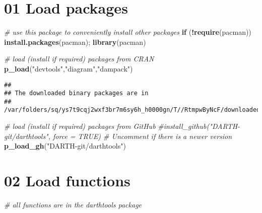 \documentclass[
]{article}
\newenvironment{Shaded}{\begin{snugshade}}{\end{snugshade}}
\newcommand{\CommentTok}[1]{\textcolor[rgb]{0.56,0.35,0.01}{\textit{#1}}}
\newcommand{\ControlFlowTok}[1]{\textcolor[rgb]{0.13,0.29,0.53}{\textbf{#1}}}
\newcommand{\FunctionTok}[1]{\textcolor[rgb]{0.13,0.29,0.53}{\textbf{#1}}}
\newcommand{\NormalTok}[1]{#1}
\newcommand{\SpecialCharTok}[1]{\textcolor[rgb]{0.81,0.36,0.00}{\textbf{#1}}}
\newcommand{\StringTok}[1]{\textcolor[rgb]{0.31,0.60,0.02}{#1}}
\begin{document}
\hypertarget{load-packages}{%
\section{01 Load packages}\label{load-packages}}

\begin{Shaded}
\begin{Highlighting}[]
\CommentTok{\# use this package to conveniently install other packages}
\ControlFlowTok{if}\NormalTok{ (}\SpecialCharTok{!}\FunctionTok{require}\NormalTok{(}\StringTok{\textquotesingle{}pacman\textquotesingle{}}\NormalTok{)) }\FunctionTok{install.packages}\NormalTok{(}\StringTok{\textquotesingle{}pacman\textquotesingle{}}\NormalTok{); }\FunctionTok{library}\NormalTok{(pacman) }

\CommentTok{\# load (install if required) packages from CRAN}
\FunctionTok{p\_load}\NormalTok{(}\StringTok{"devtools"}\NormalTok{,}\StringTok{"diagram"}\NormalTok{,}\StringTok{"dampack"}\NormalTok{)}
\end{Highlighting}
\end{Shaded}

\begin{verbatim}
## 
## The downloaded binary packages are in
##  /var/folders/sq/ys7t9cqj2wxf3br7m6sy6h_h0000gn/T//RtmpwByNcF/downloaded_packages
\end{verbatim}

\begin{Shaded}
\begin{Highlighting}[]
\CommentTok{\# load (install if required) packages from GitHub}
\CommentTok{\#install\_github("DARTH{-}git/darthtools", force = TRUE) \# Uncomment if there is a newer version}
\FunctionTok{p\_load\_gh}\NormalTok{(}\StringTok{"DARTH{-}git/darthtools"}\NormalTok{)}
\end{Highlighting}
\end{Shaded}

\hypertarget{load-functions}{%
\section{02 Load functions}\label{load-functions}}

\begin{Shaded}
\begin{Highlighting}[]
\CommentTok{\# all functions are in the darthtools package}
\end{Highlighting}
\end{Shaded}
\end{document}
